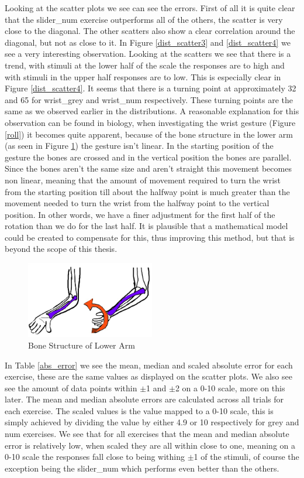Looking at the scatter plots we see can see the errors. First of all it is quite clear that the slider\_num exercise outperforms all of the others, the scatter is very close to the diagonal. The other scatters also show a clear correlation around the diagonal, but not as close to it. In Figure \ref{dist_scatter3} and \ref{dist_scatter4} we see a very interesting observation. Looking at the scatters we see that there is a trend, with stimuli at the lower half of the scale the responses are to high and with stimuli in the upper half responses are to low. This is especially clear in Figure \ref{dist_scatter4}. It seems that there is a turning point at approximately 32 and 65 for wrist\_grey and wrist\_num respectively. These turning points are the same as we observed earlier in the distributions. A reasonable explanation for this observation can be found in biology, when investigating the wrist gesture (Figure \ref{roll}) it becomes quite apparent, because of the bone structure in the lower arm (as seen in Figure \ref{bone}) the gesture isn't linear. In the starting position of the gesture the bones are crossed and in the vertical position the bones are parallel. Since the bones aren't the same size and aren't straight this movement becomes non linear, meaning that the amount of movement required to turn the wrist from the starting position till about the halfway point is much greater than the movement needed to turn the wrist from the halfway point to the vertical position. In other words, we have a finer adjustment for the first half of the rotation than we do for the last half. It is plausible that a mathematical model could be created to compensate for this, thus improving this method, but that is beyond the scope of this thesis.

\begin{figure}[h!]
    \centering
    \includegraphics[width=0.5\textwidth]{figures/bone.png}
    \caption{Bone Structure of Lower Arm\cite{bone}}
    \label{bone}
\end{figure}

In Table \ref{abs_error} we see the mean, median and scaled absolute error for each exercise, these are the same values as displayed on the scatter plots. We also see see the amount of data points within $\pm$1 and $\pm$2 on a 0-10 scale, more on this later. The mean and median absolute errors are calculated across all trials for each exercise. The scaled values is the value mapped to a 0-10 scale, this is simply achieved by dividing the value by either 4.9 or 10 respectively for grey and num exercises. We see that for all exercises that the mean and median absolute error is relatively low, when scaled they are all within close to one, meaning on a 0-10 scale the responses fall close to being withing $\pm$1 of the stimuli, of course the exception being the slider\_num which performs even better than the others.

